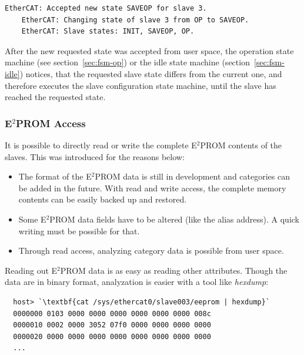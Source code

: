 \documentclass[a4paper,12pt,BCOR6mm,bibtotoc,idxtotoc]{scrbook}
\begin{document}
\begin{description}
  \begin{lstlisting}[gobble=4]
    EtherCAT: Accepted new state SAVEOP for slave 3.
    EtherCAT: Changing state of slave 3 from OP to SAVEOP.
    EtherCAT: Slave states: INIT, SAVEOP, OP.
  \end{lstlisting}

  After the new requested state was accepted from user space, the
  operation state machine (see section~\ref{sec:fsm-op}) or the idle
  state machine (section~\ref{sec:fsm-idle}) notices, that the
  requested slave state differs from the current one, and therefore
  executes the slave configuration state machine, until the slave has
  reached the requested state.
\end{description}


\subsubsection{E$^2$PROM Access}
\label{sec:eepromaccess}

It is possible to directly read or write the complete E$^2$PROM
contents of the slaves. This was introduced for the reasons below:

\begin{itemize}
\item The format of the E$^2$PROM data is still in development and
  categories can be added in the future. With read and write access,
  the complete memory contents can be easily backed up and restored.
\item Some E$^2$PROM data fields have to be altered (like the alias
  address). A quick writing must be possible for that.
\item Through read access, analyzing category data is possible from
  user space.
\end{itemize}

Reading out E$^2$PROM data is as easy as reading other
attributes. Though the data are in binary format, analyzation is
easier with a tool like \textit{hexdump}:

\begin{lstlisting}
  host> `\textbf{cat /sys/ethercat0/slave003/eeprom | hexdump}`
  0000000 0103 0000 0000 0000 0000 0000 0000 008c
  0000010 0002 0000 3052 07f0 0000 0000 0000 0000
  0000020 0000 0000 0000 0000 0000 0000 0000 0000
  ...
\end{lstlisting}
\end{document}
